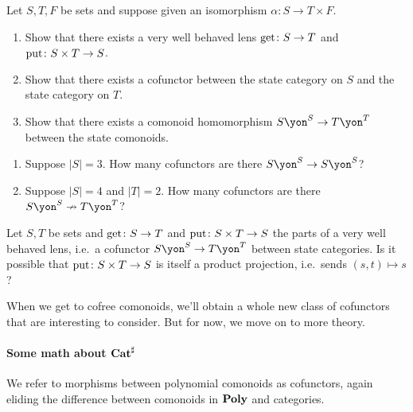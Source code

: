 \documentclass[DynamicalBook]{subfiles}
\begin{document}
\begin{exercise}\label{exc.well_behaved_boring}
Let $S,T,F$ be sets and suppose given an isomorphism $\alpha\colon S\to T\times F$.
\begin{enumerate}
	\item Show that there exists a very well behaved lens $\mathrm{get}\colon S\to T$ and $\mathrm{put}\colon S\times T\to S$.
	\item Show that there exists a cofunctor between the state category on $S$ and the state category on $T$.
	\item Show that there exists a comonoid homomorphism $S\yon^S\to T\yon^T$ between the state comonoids.
\qedhere
\end{enumerate}
\end{exercise}

\begin{exercise}\label{exc.how_many_vwbls}
\begin{enumerate}
	\item Suppose $|S|=3$. How many cofunctors are there $S\yon^S\to S\yon^S$?
	\item Suppose $|S|=4$ and $|T|=2$. How many cofunctors are there $S\yon^S\cof T\yon^T$?
\qedhere
\end{enumerate}
\end{exercise}

\begin{exercise}
Let $S,T$ be sets and $\mathrm{get}\colon S\to T$ and $\mathrm{put}\colon S\times T\to S$ the parts of a very well behaved lens, i.e.\ a cofunctor $S\yon^S\to T\yon^T$ between state categories. Is it possible that $\mathrm{put}\colon S\times T\to S$ is itself a product projection, i.e.\ sends $(s,t)\mapsto s$?
\end{exercise}

When we get to cofree comonoids, we'll obtain a whole new class of cofunctors that are interesting to consider. But for now, we move on to more theory.

\paragraph{Some math about $\textbf{Cat}^\sharp$}
We refer to morphisms between polynomial comonoids as cofunctors, again eliding the difference between comonoids in $\textbf{Poly}$ and categories.
\end{document}
